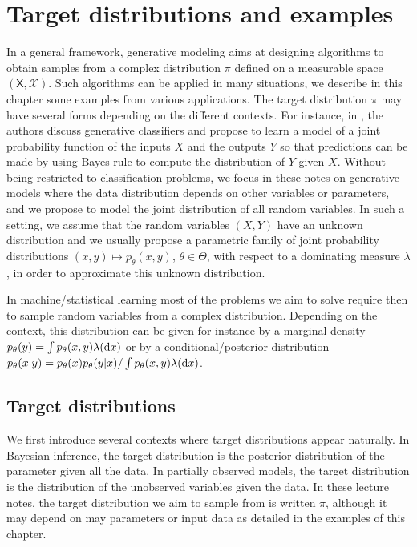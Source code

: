 \documentclass[english,graybox,envcountchap,envcountsame,sectrefs,shortlabels]{svmono}
\theoremstyle{style}
\begin{document}
\chapter{Target distributions and examples}
\minitoc
In a general framework, generative modeling aims at designing algorithms to obtain samples from a complex distribution $\pi$ defined on a measurable space $(\mathsf{X},\mathcal{X})$. Such algorithms can be applied in many situations, we describe in this chapter some examples from various applications. The target distribution $\pi$ may have several forms depending on the different contexts.
 For instance, in \cite{ng2001discriminative}, the authors discuss generative classifiers and propose to learn a model of a joint probability function of the inputs $X$ and the outputs $Y$ so that predictions can be made by using Bayes rule to compute the distribution of $Y$ given $X$. Without being restricted to classification problems, we focus in these notes on generative models where the data distribution depends on other variables or parameters, and we propose to model the joint distribution of all random variables. In such a setting, we assume that the random variables $(X,Y)$ have an unknown distribution and we usually propose a parametric family of joint probability distributions $(x,y)\mapsto p_\theta(x,y)$, $\theta\in\Theta$, with respect to a dominating measure $\lambda$, in order to approximate this unknown distribution. 

In machine/statistical learning most of the problems we aim to solve require then to sample random variables from a complex distribution. Depending on the context, this distribution can be given for instance by a marginal density $p_\theta(y) = \int p_\theta(x,y) \lambda(\mathrm{d} x)$ or by a conditional/posterior distribution $p_\theta(x|y) = p_\theta(x)p_\theta(y|x)/\int p_\theta(x,y) \lambda(\mathrm{d} x)$.



\section{Target distributions}
We first introduce several contexts where target distributions appear naturally. In Bayesian inference, the target distribution is the posterior distribution of the parameter given all the data. In partially observed models, the target distribution is the distribution of the unobserved variables given the data. In these lecture notes, the target distribution we aim to sample from is written $\pi$, although it may depend on may parameters or input data as detailed in the examples of this chapter.
\end{document}
